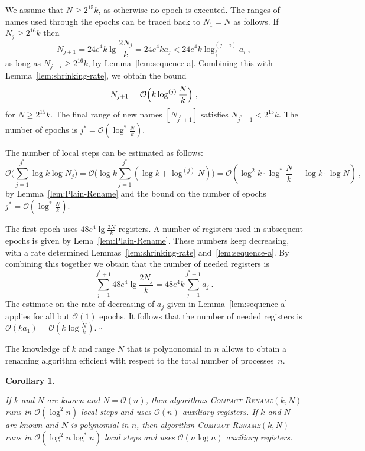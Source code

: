 \documentclass[11pt]{article}
\newcommand{\cO}{\mathcal{O}}
\newcommand{\qed}{\hfill $\square$ \smallbreak}
\newenvironment{proof}{\noindent{\bf Proof:}}{\qed}
\newtheorem{corollary}{Corollary}
\begin{document}
\begin{proof}
We assume  that $N\ge 2^{15}k$, as otherwise no epoch is executed.
The ranges of names used through the epochs can be traced back to $N_1=N$ as follows.
If $N_j\ge 2^{16} k$ then 
\[
N_{j+1} 
=
24e^4 k \lg\frac{2N_j}{k} 
=
24e^4 k a_j
< 
24e^4 k \log_{\frac{3}{2}}^{(j-i)} a_i
\ ,
\]
as long as $N_{j-i}\ge 2^{16}k$, by Lemma~\ref{lem:sequence-a}.
Combining this with Lemma~\ref{lem:shrinking-rate}, we obtain the bound
\[
N_{j+1} = \cO\Bigl(k\log^{(j)} \frac{N}{k}\Bigr)
\ ,
\]
 for $N\ge 2^{15}k$.
The final range of new names $[N_{j^\ast+1}]$ satisfies $N_{j^*+1} < 2^{15} k$.
The number of epochs is $j^\ast=\cO(\log^\ast \frac{N}{k})$. 


The number of local steps can be estimated as follows:
\[
\cO\bigl(\sum_{j=1}^{j^*} \log k \log N_j\bigr) 
=
\cO\bigl(\log k \sum_{j=1}^{j^*}  (\log k + \log^{(j)} N)\bigr) 
=
\cO(\log^2 k\cdot \log^* \frac{N}{k}+\log k \cdot \log N )\ ,
\]
by Lemma~\ref{lem:Plain-Rename} and the bound  on the number of epochs  $j^\ast=\cO(\log^\ast \frac{N}{k})$.

The first epoch uses $48 e^4\lg \frac{2N}{k}$ registers.
A number of registers used in subsequent epochs is given by Lema~\ref{lem:Plain-Rename}.
These numbers keep decreasing, with a rate determined Lemmas~\ref{lem:shrinking-rate} and~\ref{lem:sequence-a}.
By combining this together we obtain that the number of needed registers  is
\[
\sum_{j=1}^{j^*+1} 48 e^4\lg \frac{2N_j}{k} = 48 e^4 k \sum_{j=1}^{j^*+1} a_j
 \ .
\]
The estimate on the rate of decreasing of $a_j$ given in Lemma~\ref{lem:sequence-a} applies for all but $\cO(1)$ epochs.
It follows that the number of needed registers is $\cO(k a_1)= \cO(k\log\frac{N}{k})$.
\end{proof}

The knowledge of $k$ and range $N$ that is polynonomial in $n$ allows to obtain a renaming algorithm efficient with respect to the total number of processes~$n$.



\begin{corollary}
\label{cor:known-k-and-N-rename}

If $k$ and $N$ are known and $N=\cO(n)$, then algorithms \textsc{Compact-Rename}$(k,N)$ runs in $\cO(\log^2 n)$ local steps and uses $\cO(n)$ auxiliary registers. 
If $k$ and $N$ are known and $N$ is polynomial in $n$, then algorithm \textsc{Compact-Rename}$(k,N)$ runs in $\cO(\log^2 n \log^* n)$ local steps and uses $\cO(n\log n)$ auxiliary registers. 
\end{corollary}
\end{document}
